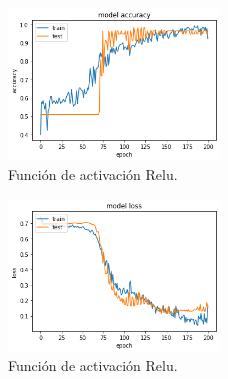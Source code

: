 \begin{figure}
    \centering
    \includegraphics[width=0.5\textwidth]{images/chapter2/batch_256_200_epoch.png}
    \caption{Función de activación Relu.}
    \label{fig:Resultados de la precisión de entrenamiento con un batch-size de 256 y 200 epochs}
\end{figure}

\begin{figure}
    \centering
    \includegraphics[width=0.5\textwidth]{images/chapter2/batch_256_200_epoch_loss.png}
    \caption{Función de activación Relu.}
    \label{fig:Resultados de loss en el entrenamiento con un batch-size de 256 y 200 epochs, }
\end{figure}


\fi
